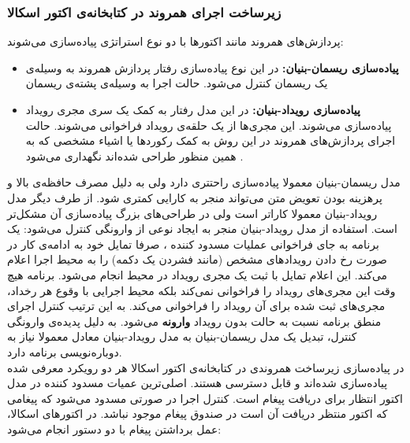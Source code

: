 \subsubsection{ زیرساخت اجرای همروند در کتابخانه‌ی اکتور اسکالا}
\label{ref:receive_react}
پردازش‌های همروند مانند اکتور‌ها با دو نوع استراتژی پیاده‌سازی می‌شوند:
\begin{itemize}
\item \textbf{پیاده‌سازی \gls{ریسمان-بنیان}:}
در این نوع پیاده‌سازی رفتار پردازش همروند به وسیله‌ی یک ریسمان کنترل می‌شود. حالت اجرا به وسیله‌ی  \gls{پشته}‌ی ریسمان\cite{concurrent_prog_java}

\item \textbf{پیاده‌سازی \gls{رویداد-بنیان}:}
در این مدل رفتار به کمک یک سری \gls{مجری رویداد} پیاده‌سازی می‌شوند. این مجری‌ها از یک حلقه‌ی رویداد فراخوانی می‌شوند. حالت اجرای پردازش‌های همروند در این روش به کمک رکورد‌ها یا اشیاء مشخصی که به همین منظور طراحی شده‌اند نگهداری می‌شود \cite{SEDA}.
\end{itemize}
مدل ریسمان-بنیان معمولا پیاده‌سازی راحتتری دارد ولی به دلیل مصرف حافظه‌ی بالا و پرهزینه بودن \gls{تعویض متن} می‌تواند منجر به کارایی کمتری شود\cite{WhyThreadsAreABadIdea}. از طرف دیگر مدل رویداد-بنیان معمولا کاراتر است ولی در طراحی‌های بزرگ پیاده‌سازی آن مشکل‌تر است\cite{whyevents}.
استفاده از مدل رویداد-بنیان منجر به ایجاد نوعی از \gls{وارونگی کنترل} می‌شود: یک برنامه به جای فراخوانی عملیات \gls{مسدود کننده} ، صرفا تمایل خود به ادامه‌ی کار در صورت رخ دادن رویدادهای مشخص (مانند فشردن یک دکمه) را به محیط اجرا اعلام می‌کند. این اعلام تمایل با ثبت یک مجری رویداد در محیط انجام می‌شود. برنامه هیچ وقت این مجری‌های رویداد را فراخوانی نمی‌کند بلکه محیط اجرایی با وقوع هر رخداد، مجری‌های ثبت شده برای آن رویداد را فراخوانی می‌کند. به این ترتیب کنترل اجرای منطق برنامه نسبت به حالت بدون رویداد \textbf{وارونه} می‌شود. به دلیل پدیده‌ی وارونگی کنترل، تبدیل یک مدل ریسمان-بنیان به مدل رویداد-بنیان معادل معمولا نیاز به دوباره‌نویسی برنامه دارد\cite{responders2006}.
\\
در پیاده‌سازی زیرساخت همروندی در کتابخانه‌ی اکتور اسکالا هر دو رویکرد معرفی شده پیاده‌سازی شده‌اند و قابل دسترسی هستند. اصلی‌ترین عمیات مسدود کننده در مدل اکتور انتظار برای دریافت پیغام است. کنترل اجرا در صورتی مسدود می‌شود که پیغامی که اکتور منتظر دریافت آن است در صندوق پیغام موجود نباشد. در اکتور‌های اسکالا، عمل برداشتن پیغام با دو دستور انجام می‌شود:
